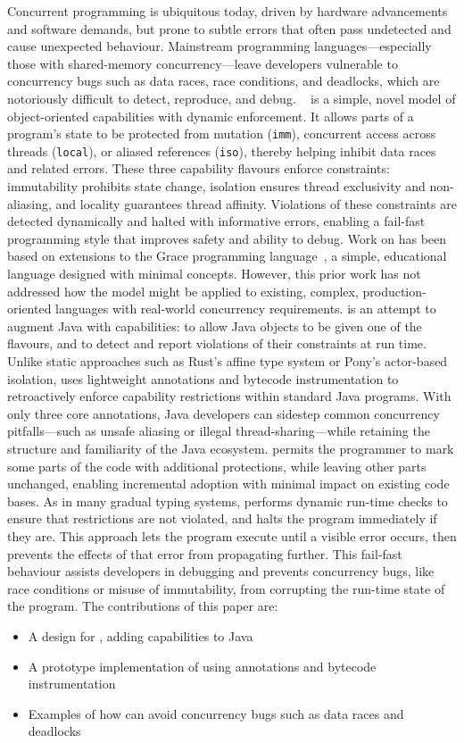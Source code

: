 \documentclass[JDala.tex]{subfiles}
\begin{document}
%
Concurrent programming is ubiquitous today, driven by hardware advancements and software demands, but prone to subtle errors that often pass undetected and cause unexpected behaviour. Mainstream programming languages—especially those with shared-memory concurrency—leave developers vulnerable to concurrency bugs such as data races, race conditions, and deadlocks, which are notoriously difficult to detect, reproduce, and debug.
%
\dala~\cite{Dala_Paper,DafnyExperience-Noble2024} is a simple, novel model of object-oriented capabilities with dynamic enforcement. It allows parts of a program’s state to be protected from mutation (\texttt{imm}), concurrent access across threads (\texttt{local}), or aliased references (\texttt{iso}), thereby helping inhibit data races and related errors. These three capability flavours enforce constraints: immutability prohibits state change, isolation ensures thread exclusivity and non-aliasing, and locality guarantees thread affinity. Violations of these constraints are detected dynamically and halted with informative errors, enabling a fail-fast programming style that improves safety and ability to debug.
%
Work on \dala has been based on extensions to the Grace programming language~\cite{GraceAbsence-Black2012}, a simple, educational language designed with minimal concepts. However, this prior work has not addressed how the model might be applied to existing, complex, production-oriented languages with real-world concurrency requirements.
%
\jdala is an attempt to augment Java with \dala capabilities: to allow Java objects to be given one of the \dala flavours, and to detect and report violations of their constraints at run time. Unlike static approaches such as Rust’s affine type system or Pony’s actor-based isolation, \jdala uses lightweight annotations and bytecode instrumentation to retroactively enforce capability restrictions within standard Java programs. With only three core annotations, Java developers can sidestep common concurrency pitfalls—such as unsafe aliasing or illegal thread-sharing—while retaining the structure and familiarity of the Java ecosystem.
%
\jdala permits the programmer to mark some parts of the code with additional protections, while leaving other parts unchanged, enabling incremental adoption with minimal impact on existing code bases. As in many gradual typing systems, \jdala performs dynamic run-time checks to ensure that restrictions are not violated, and halts the program immediately if they are. This approach lets the program execute until a visible error occurs, then prevents the effects of that error from propagating further. This fail-fast behaviour assists developers in debugging and prevents concurrency bugs, like race conditions or misuse of immutability, from corrupting the run-time state of the program.
%
The contributions of this paper are:
\begin{itemize}
\item A design for \jdala, adding \dala capabilities to Java
\item A prototype implementation of \jdala using annotations and bytecode instrumentation
\item Examples of how \jdala can avoid concurrency bugs such as data races and deadlocks
\end{itemize}
\end{document}
